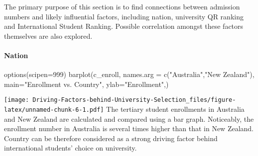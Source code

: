 \documentclass[
]{article}
\newenvironment{Shaded}{\begin{snugshade}}{\end{snugshade}}
\newcommand{\AttributeTok}[1]{\textcolor[rgb]{0.77,0.63,0.00}{#1}}
\newcommand{\DecValTok}[1]{\textcolor[rgb]{0.00,0.00,0.81}{#1}}
\newcommand{\FunctionTok}[1]{\textcolor[rgb]{0.00,0.00,0.00}{#1}}
\newcommand{\NormalTok}[1]{#1}
\newcommand{\OtherTok}[1]{\textcolor[rgb]{0.56,0.35,0.01}{#1}}
\newcommand{\SpecialCharTok}[1]{\textcolor[rgb]{0.00,0.00,0.00}{#1}}
\newcommand{\StringTok}[1]{\textcolor[rgb]{0.31,0.60,0.02}{#1}}
\begin{document}
The primary purpose of this section is to find connections between
admission numbers and likely influential factors, including nation,
university QR ranking and International Student Ranking. Possible
correlation amongst these factors themselves are also explored.

\hypertarget{nation}{%
\paragraph{Nation}\label{nation}}

\begin{Shaded}
\end{Shaded}

\begin{Shaded}
\end{Shaded}

\begin{Shaded}
\begin{Highlighting}[]
\FunctionTok{options}\NormalTok{(}\AttributeTok{scipen=}\DecValTok{999}\NormalTok{)}
\FunctionTok{barplot}\NormalTok{(c\_enroll,}
        \AttributeTok{names.arg =} \FunctionTok{c}\NormalTok{(}\StringTok{"Australia"}\NormalTok{,}\StringTok{"New Zealand"}\NormalTok{),}
        \AttributeTok{main=}\StringTok{"Enrollment vs. Country"}\NormalTok{,}
        \AttributeTok{ylab=}\StringTok{"Enrollment"}\NormalTok{,)}
\end{Highlighting}
\end{Shaded}

\texttt{[image: Driving-Factors-behind-University-Selection\_files/figure-latex/unnamed-chunk-6-1.pdf]}
The tertiary student enrollments in Australia and New Zealand are
calculated and compared using a bar graph. Noticeably, the enrollment
number in Australia is several times higher than that in New Zealand.
Country can be therefore considered as a strong driving factor behind
international students' choice on university.
\end{document}

